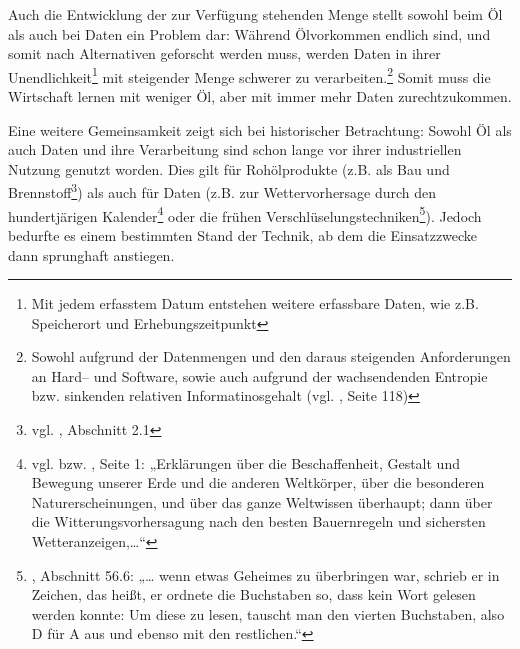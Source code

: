 Auch die Entwicklung der zur Verfügung stehenden Menge stellt sowohl beim Öl als auch bei Daten ein Problem dar: Während Ölvorkommen endlich sind, und somit nach Alternativen geforscht werden muss, werden Daten in ihrer Unendlichkeit\footnote{Mit jedem erfasstem Datum entstehen weitere erfassbare Daten, wie z.B. Speicherort und Erhebungszeitpunkt} mit steigender Menge schwerer zu verarbeiten.\footnote{Sowohl aufgrund der Datenmengen und den daraus steigenden Anforderungen an Hard-- und Software, sowie auch aufgrund der wachsendenden Entropie bzw. sinkenden relativen Informatinosgehalt (vgl. \cite{wiener}, Seite 118)} Somit muss die Wirtschaft lernen mit weniger Öl, aber mit immer mehr Daten zurechtzukommen.

Eine weitere Gemeinsamkeit zeigt sich bei historischer Betrachtung: Sowohl Öl als auch Daten und ihre Verarbeitung sind schon lange vor ihrer industriellen Nutzung genutzt worden. Dies gilt für Rohölprodukte (z.B. als Bau und Brennstoff\footnote{vgl. \cite{pressler}, Abschnitt 2.1}) als auch für Daten (z.B. zur Wettervorhersage durch den hundertjärigen Kalender\footnote{vgl. \cite{dwd} bzw. \cite{knauer100}, Seite 1: „Erklärungen über die Beschaffenheit, Gestalt und Bewegung unserer Erde und die anderen Weltkörper, über die besonderen Naturerscheinungen, und über das ganze Weltwissen überhaupt; dann über die Witterungsvorhersagung nach den besten Bauernregeln und sichersten Wetteranzeigen,…“} oder die frühen Verschlüselungstechniken\footnote{\cite{suetonius}, Abschnitt 56.6: „… wenn etwas Geheimes zu überbringen war, schrieb er in Zeichen, das heißt, er ordnete die Buchstaben so, dass kein Wort gelesen werden konnte: Um diese zu lesen, tauscht man den vierten Buchstaben, also D für A aus und ebenso mit den restlichen.“}). Jedoch bedurfte es einem bestimmten Stand der Technik, ab dem die Einsatzzwecke dann sprunghaft anstiegen.

